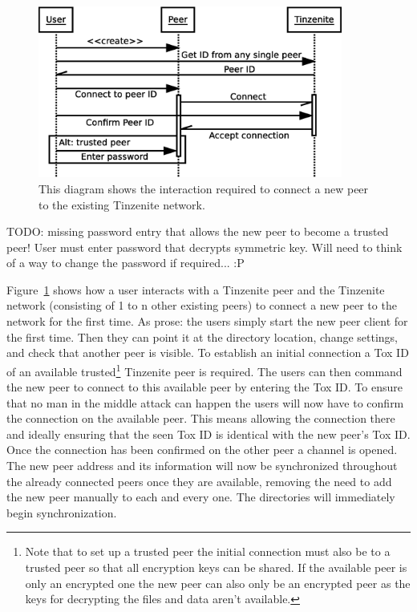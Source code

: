 \begin{figure}[htp]
\centering
    \includegraphics[width=10cm]{diagram/sequence_new_connect}
\caption[New Connection Sequence Diagram]{This diagram shows the interaction required to connect a new peer to the existing Tinzenite network.}
\label{diagram:new_connection}
\end{figure}

TODO: missing password entry that allows the new peer to become a trusted peer!
User must enter password that decrypts symmetric key.
Will need to think of a way to change the password if required... :P

Figure~\ref{diagram:new_connection} shows how a user interacts with a Tinzenite peer and the Tinzenite network (consisting of 1 to n other existing peers) to connect a new peer to the network for the first time.
As prose: the users simply start the new peer client for the first time.
Then they can point it at the directory location, change settings, and check that another peer is visible.
To establish an initial connection a Tox ID of an available trusted\footnote{Note that to set up a trusted peer the initial connection must also be to a trusted peer so that all encryption keys can be shared. If the available peer is only an encrypted one the new peer can also only be an encrypted peer as the keys for decrypting the files and data aren't available.} Tinzenite peer is required.
The users can then command the new peer to connect to this available peer by entering the Tox ID.
To ensure that no man in the middle attack can happen the users will now have to confirm the connection on the available peer.
This means allowing the connection there and ideally ensuring that the seen Tox ID is identical with the new peer's Tox ID.
Once the connection has been confirmed on the other peer a channel is opened.
The new peer address and its information will now be synchronized throughout the already connected peers once they are available, removing the need to add the new peer manually to each and every one.
The directories will immediately begin synchronization.

